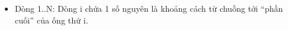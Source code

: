 \begin{itemize}
	\item     Dòng 1..N: Dòng i chứa 1 số nguyên là khoảng            cách từ chuồng tới “phần cuối” của ống thứ i.   
\end{itemize}

\